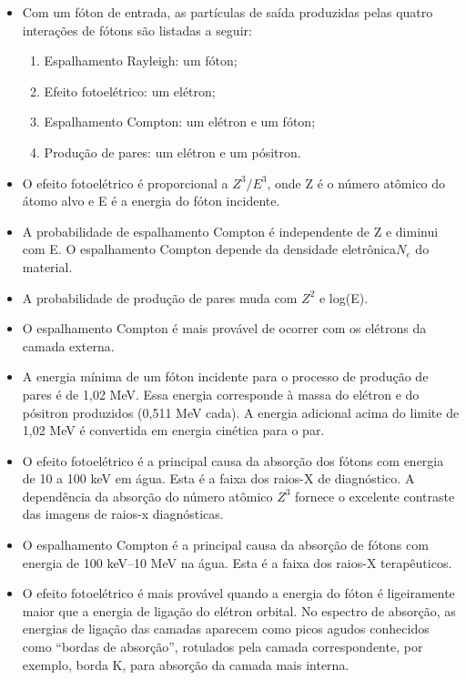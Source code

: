 \documentclass[11pt,a4paper]{article}
\newcounter{exemplo}
\begin{document}
\begin{exemplo}
\begin{itemize}
        \item Com um fóton de entrada, as partículas de saída produzidas pelas quatro interações de fótons são listadas a seguir:
            \begin{enumerate}
                \item Espalhamento Rayleigh: um fóton;
                \item Efeito fotoelétrico: um elétron;
                \item Espalhamento Compton: um elétron e um fóton;
                \item Produção de pares: um elétron e um pósitron.
            \end{enumerate}

        \item O efeito fotoelétrico é proporcional a $Z^3/E^3$, onde Z é o número atômico do átomo alvo e E é a energia do fóton incidente.
        
        \item A probabilidade de espalhamento Compton é independente de Z e diminui com E. O espalhamento Compton depende da densidade eletrônica$N_e$ do material.
        
        \item A probabilidade de produção de pares muda com $Z^2$ e log(E).
        
        \item O espalhamento Compton é mais provável de ocorrer com os elétrons da camada externa.
        
        \item A energia mínima de um fóton incidente para o processo de produção de pares é de 1,02 MeV. Essa energia corresponde à massa do elétron e do pósitron produzidos (0,511 MeV cada). A energia adicional acima do limite de 1,02 MeV é convertida em energia cinética para o par.
        
        \item O efeito fotoelétrico é a principal causa da absorção dos fótons com energia de 10 a 100 keV em água. Esta é a faixa dos raios-X de diagnóstico. A dependência da absorção do número atômico $Z^3$ fornece o excelente contraste das imagens de raios-x diagnósticas.
        
        \item O espalhamento Compton é a principal causa da absorção de fótons com energia de 100 keV–10 MeV na água. Esta é a faixa dos raios-X terapêuticos.
        
        \item O efeito fotoelétrico é mais provável quando a energia do fóton é ligeiramente maior que a energia de ligação do elétron orbital. No espectro de absorção, as energias de ligação das camadas aparecem como picos agudos conhecidos como “bordas de absorção”, rotulados pela camada correspondente, por exemplo, borda K, para absorção da camada mais interna.
        

\end{itemize}
\end{exemplo}
\end{document}
